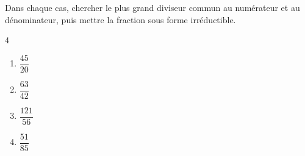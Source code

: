 \begin{exo}{}
	Dans chaque cas, chercher le plus grand diviseur commun au numérateur et au dénominateur, puis mettre la fraction sous forme irréductible.
	\vspace*{-2mm} \begin{multicols}{4}
		\begin{enumerate}
			\item $\dfrac{45}{20}$
			\item $\dfrac{63}{42}$
			\item $\dfrac{121}{56}$
			\item $\dfrac{51}{85}$
		\end{enumerate}
	\end{multicols}\vspace*{-2mm}
\end{exo}
